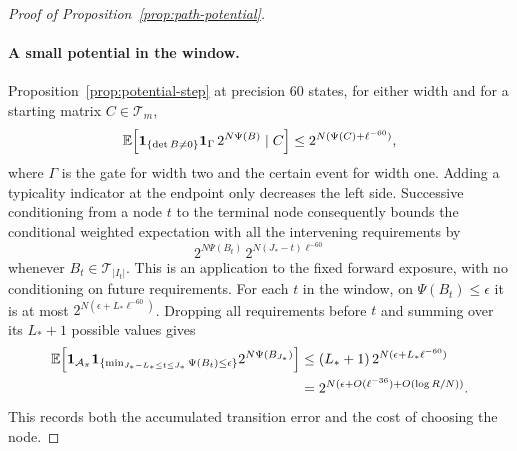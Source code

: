 \begin{proof}[Proof of Proposition~\ref{prop:path-potential}]
\paragraph{A small potential in the window.}
Proposition~\ref{prop:potential-step} at precision \(60\)
states, for either width and for a starting matrix \(C\in\mathcal T_m\),
\[
 \mathbb E\!\left[\mathbf 1_{\{\det B\ne0\}}\mathbf 1_{\Gamma}\,
                   2^{N\Psi(B)}\mid C\right]
       \le2^{N(\Psi(C)+\ell^{-60})},
\]
where \(\Gamma\) is the gate for width two and the certain event for
width one. Adding a typicality indicator at the endpoint only
decreases the left side. Successive conditioning from a node \(t\)
to the terminal node consequently bounds the conditional weighted
expectation with all the intervening requirements by
\[
 2^{N\Psi(B_t)}\,2^{N(J_*-t)\ell^{-60}}
\]
whenever \(B_t\in\mathcal T_{|I_t|}\). This is an application to the
fixed forward exposure, with no conditioning on future requirements.
For each \(t\) in the window, on \(\Psi(B_t)\le\epsilon\) it is at
most \(2^{N(\epsilon+L_*\ell^{-60})}\). Dropping all requirements
before \(t\) and summing over its \(L_*+1\) possible values gives
\begin{equation}\label{eq:path-low-window}
 \begin{split}
 \mathbb E\!\left[\mathbf 1_{\mathcal A_\pi}
       \mathbf 1_{\{\min_{J_*-L_*\le t\le J_*}\Psi(B_t)\le\epsilon\}}
                  2^{N\Psi(B_{J_*})}\right]
 &\le(L_*+1)\,2^{N(\epsilon+L_*\ell^{-60})}\\
 &=2^{N(\epsilon+O(\ell^{-36})+O(\log R/N))}.
 \end{split}
\end{equation}
This records both the accumulated transition error and the cost of
choosing the node.


\end{proof}
